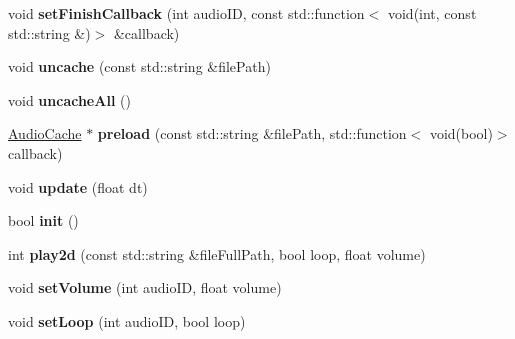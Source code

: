 \begin{DoxyCompactItemize}
void {\bfseries set\+Finish\+Callback} (int audio\+ID, const std\+::function$<$ void(int, const std\+::string \&)$>$ \&callback)
\item 
\mbox{\label{classexperimental_1_1AudioEngineImpl_a4ad8d3d499bf3e5fd262d710b215891e}} 
void {\bfseries uncache} (const std\+::string \&file\+Path)
\item 
\mbox{\label{classexperimental_1_1AudioEngineImpl_ae439dacc5acebf311686ebf6f1f6b3df}} 
void {\bfseries uncache\+All} ()
\item 
\mbox{\label{classexperimental_1_1AudioEngineImpl_a220cb2755bcaa7d4ae17e2740a9abf8c}} 
\hyperlink{classexperimental_1_1AudioCache}{Audio\+Cache} $\ast$ {\bfseries preload} (const std\+::string \&file\+Path, std\+::function$<$ void(bool)$>$ callback)
\item 
\mbox{\label{classexperimental_1_1AudioEngineImpl_a0aa9187ac5e5341a505cf6154feceaee}} 
void {\bfseries update} (float dt)
\item 
\mbox{\label{classexperimental_1_1AudioEngineImpl_ab6f0bd94aefe53088bb4d87560a87331}} 
bool {\bfseries init} ()
\item 
\mbox{\label{classexperimental_1_1AudioEngineImpl_abcabc0449cdfb6c488791972569e578c}} 
int {\bfseries play2d} (const std\+::string \&file\+Full\+Path, bool loop, float volume)
\item 
\mbox{\label{classexperimental_1_1AudioEngineImpl_a0d336c5f4f383a70463ab23eb8be2a2e}} 
void {\bfseries set\+Volume} (int audio\+ID, float volume)
\item 
\mbox{\label{classexperimental_1_1AudioEngineImpl_af9d511c772e6278d99dceb9f8af1d986}} 
void {\bfseries set\+Loop} (int audio\+ID, bool loop)
\item 
\mbox{\label{classexperimental_1_1AudioEngineImpl_acfbf1c888af4835ae02626327ae0ab47}} 

\end{DoxyCompactItemize}
